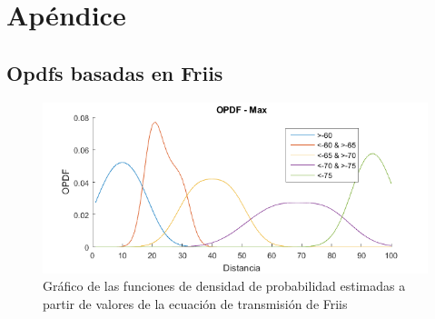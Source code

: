 \let\textcircled=\pgftextcircled
\chapter {Apéndice}
\label{chap:Apendice}

\section{Opdfs basadas en Friis}

\begin{figure}[!htp]
	\centering
	\includegraphics[width=\linewidth]{images/opdf-friis.png}
	\captionsetup{width=0.8\linewidth}
	\caption{Gráfico de las funciones de densidad de probabilidad estimadas a partir de valores de la ecuación de transmisión de Friis}
    \label{fig:opdf-friis}
\end{figure}

